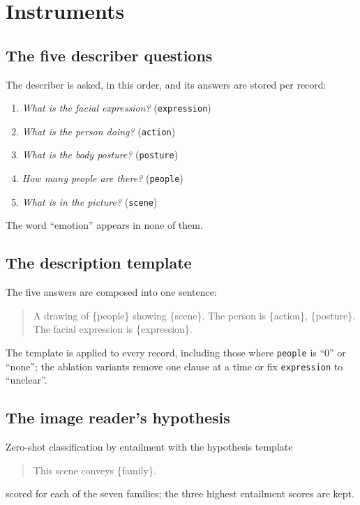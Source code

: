 \chapter{Instruments}
\label{app:instruments}

\section{The five describer questions}
The describer is asked, in this order, and its answers are stored per record:
\begin{enumerate}\setlength{\itemsep}{1pt}
\item \emph{What is the facial expression?} (\texttt{expression})
\item \emph{What is the person doing?} (\texttt{action})
\item \emph{What is the body posture?} (\texttt{posture})
\item \emph{How many people are there?} (\texttt{people})
\item \emph{What is in the picture?} (\texttt{scene})
\end{enumerate}
The word ``emotion'' appears in none of them.

\section{The description template}
The five answers are composed into one sentence:
\begin{quote}\ttfamily
A drawing of \{people\} showing \{scene\}. The person is \{action\}, \{posture\}. The facial expression is \{expression\}.
\end{quote}
The template is applied to every record, including those where \texttt{people} is ``0'' or ``none''; the ablation variants remove one clause at a time or fix \texttt{expression} to ``unclear''.

\section{The image reader's hypothesis}
Zero-shot classification by entailment with the hypothesis template
\begin{quote}\ttfamily
This scene conveys \{family\}.
\end{quote}
scored for each of the seven families; the three highest entailment scores are kept.

